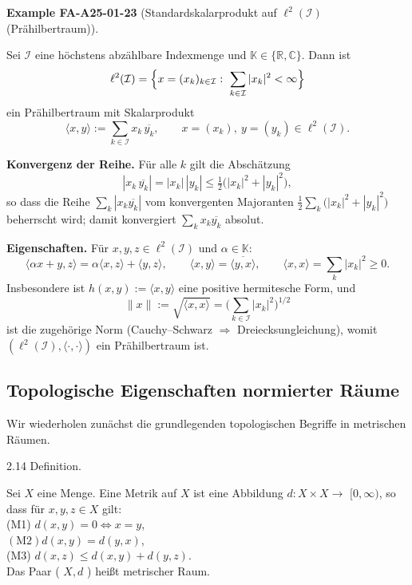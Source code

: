\documentclass[10pt, letterpaper]{article}
\newcommand{\CustomHeading}[3]{%
  \par\medskip\noindent%
  \textbf{#1 #2} \textnormal{(#3)}.\enskip%
}
\newenvironment{EXA}[2]{\begin{unitbox}\CustomHeading{Example}{#1}{#2}}{\end{unitbox}}
\begin{document}
\begin{EXA}{FA-A25-01-23}{Standardskalarprodukt auf $\ell^{2}(\mathcal{I})$ (Prähilbertraum)}
Sei $\mathcal{I}$ eine höchstens abzählbare Indexmenge und $\mathbb{K}\in\{\mathbb{R},\mathbb{C}\}$.
Dann ist
\[
\ell^{2}(\mathcal{I})
=\Bigl\{x=(x_{k})_{k\in\mathcal{I}}:\ \sum_{k\in\mathcal{I}}|x_{k}|^{2}<\infty\Bigr\}
\]
ein Prähilbertraum mit Skalarprodukt
\[
\langle x,y\rangle
:=\sum_{k\in\mathcal{I}} x_{k}\,\overline{y_{k}},
\qquad x=(x_{k}),\ y=(y_{k})\in \ell^{2}(\mathcal{I}).
\]

\textbf{Konvergenz der Reihe.}
Für alle $k$ gilt die Abschätzung
\[
|x_{k}\,\overline{y_{k}}|=|x_{k}|\,|y_{k}|
\le \tfrac{1}{2}\big(|x_{k}|^{2}+|y_{k}|^{2}\big),
\]
so dass die Reihe $\sum_{k}|x_{k}\overline{y_{k}}|$ vom konvergenten Majoranten
$\tfrac{1}{2}\sum_{k}\big(|x_{k}|^{2}+|y_{k}|^{2}\big)$ beherrscht wird; damit konvergiert
$\sum_{k}x_{k}\overline{y_{k}}$ absolut.

\textbf{Eigenschaften.}
Für $x,y,z\in \ell^{2}(\mathcal{I})$ und $\alpha\in\mathbb{K}$:
\[
\langle \alpha x+y, z\rangle=\alpha \langle x,z\rangle+\langle y,z\rangle,\qquad
\langle x,y\rangle=\overline{\langle y,x\rangle},\qquad
\langle x,x\rangle=\sum_{k}|x_{k}|^{2}\ge 0.
\]
Insbesondere ist $h(x,y):=\langle x,y\rangle$ eine positive hermitesche Form, und
\[
\|x\|:=\sqrt{\langle x,x\rangle}
=\Big(\sum_{k\in\mathcal{I}}|x_{k}|^{2}\Big)^{1/2}
\]
ist die zugehörige Norm (Cauchy--Schwarz $\Rightarrow$ Dreiecksungleichung),
womit $(\ell^{2}(\mathcal{I}),\langle\cdot,\cdot\rangle)$ ein Prähilbertraum ist.
\end{EXA}


\pagebreak




\subsection*{Topologische Eigenschaften normierter Räume}


Wir wiederholen zunächst die grundlegenden topologischen Begriffe in metrischen Räumen.


2.14 Definition. 


Sei $X$ eine Menge. Eine Metrik auf $X$ ist eine Abbildung $d: X \times X \rightarrow$ $[0, \infty)$, so dass für $x, y, z \in X$ gilt:\\
(M1) $d(x, y)=0 \Longleftrightarrow x=y$,\\
$(\mathrm{M} 2) d(x, y)=d(y, x)$,\\
(M3) $d(x, z) \leq d(x, y)+d(y, z)$.\\
Das Paar ( $X, d$ ) heißt metrischer Raum.\\
\end{document}
